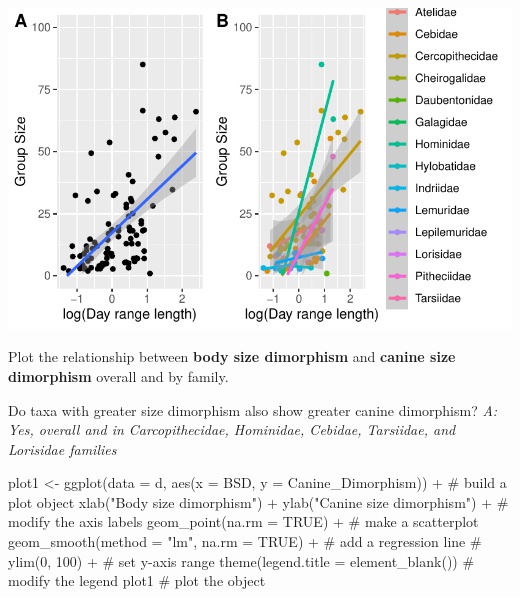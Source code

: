 \documentclass[
  letterpaper,
  DIV=11,
  numbers=noendperiod]{scrartcl}
\newenvironment{Shaded}{\begin{snugshade}}{\end{snugshade}}
\newcommand{\AttributeTok}[1]{\textcolor[rgb]{0.40,0.45,0.13}{#1}}
\newcommand{\CommentTok}[1]{\textcolor[rgb]{0.37,0.37,0.37}{#1}}
\newcommand{\ConstantTok}[1]{\textcolor[rgb]{0.56,0.35,0.01}{#1}}
\newcommand{\FunctionTok}[1]{\textcolor[rgb]{0.28,0.35,0.67}{#1}}
\newcommand{\NormalTok}[1]{\textcolor[rgb]{0.00,0.23,0.31}{#1}}
\newcommand{\OtherTok}[1]{\textcolor[rgb]{0.00,0.23,0.31}{#1}}
\newcommand{\SpecialCharTok}[1]{\textcolor[rgb]{0.37,0.37,0.37}{#1}}
\newcommand{\StringTok}[1]{\textcolor[rgb]{0.13,0.47,0.30}{#1}}
\begin{document}
\includegraphics{EDA-challenge_files/figure-pdf/unnamed-chunk-4-3.pdf}

Plot the relationship between \textbf{body size dimorphism} and
\textbf{canine size dimorphism} overall and by family.

Do taxa with greater size dimorphism also show greater canine
dimorphism? \emph{A: Yes, overall and in Carcopithecidae, Hominidae,
Cebidae, Tarsiidae, and Lorisidae families}

\begin{Shaded}
\begin{Highlighting}[]
\NormalTok{plot1 }\OtherTok{\textless{}{-}} \FunctionTok{ggplot}\NormalTok{(}\AttributeTok{data =}\NormalTok{ d, }
            \FunctionTok{aes}\NormalTok{(}\AttributeTok{x =}\NormalTok{ BSD, }
                \AttributeTok{y =}\NormalTok{ Canine\_Dimorphism)) }\SpecialCharTok{+}  \CommentTok{\# build a plot object}
  \FunctionTok{xlab}\NormalTok{(}\StringTok{"Body size dimorphism"}\NormalTok{) }\SpecialCharTok{+} \FunctionTok{ylab}\NormalTok{(}\StringTok{"Canine size dimorphism"}\NormalTok{) }\SpecialCharTok{+} \CommentTok{\# modify the axis labels}
  \FunctionTok{geom\_point}\NormalTok{(}\AttributeTok{na.rm =} \ConstantTok{TRUE}\NormalTok{) }\SpecialCharTok{+} \CommentTok{\# make a scatterplot}
  \FunctionTok{geom\_smooth}\NormalTok{(}\AttributeTok{method =} \StringTok{"lm"}\NormalTok{, }\AttributeTok{na.rm =} \ConstantTok{TRUE}\NormalTok{) }\SpecialCharTok{+} \CommentTok{\# add a regression line}
  \CommentTok{\# ylim(0, 100) + \# set y{-}axis range}
  \FunctionTok{theme}\NormalTok{(}\AttributeTok{legend.title =} \FunctionTok{element\_blank}\NormalTok{()) }\CommentTok{\# modify the legend}
\NormalTok{plot1 }\CommentTok{\# plot the object}
\end{Highlighting}
\end{Shaded}
\end{document}
